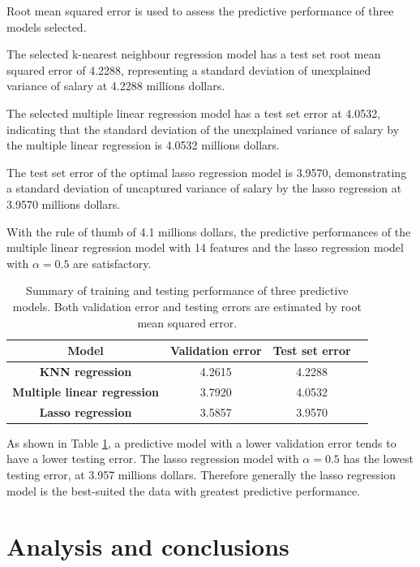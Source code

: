\documentclass[letterpaper,12pt,twoside,]{pinp}
\begin{document}
Root mean squared error is used to assess the predictive performance of
three models selected.

The selected k-nearest neighbour regression model has a test set root
mean squared error of 4.2288, representing a standard deviation of
unexplained variance of salary at 4.2288 millions dollars.

The selected multiple linear regression model has a test set error at
4.0532, indicating that the standard deviation of the unexplained
variance of salary by the multiple linear regression is 4.0532 millions
dollars.

The test set error of the optimal lasso regression model is 3.9570,
demonstrating a standard deviation of uncaptured variance of salary by
the lasso regression at 3.9570 millions dollars.

With the rule of thumb of 4.1 millions dollars, the predictive
performances of the multiple linear regression model with 14 features
and the lasso regression model with \(\alpha=0.5\) are satisfactory.

\begin{table}
\begin{tabular}{ |c|c|c|c| } 
\hline
\textbf{Model} & \textbf{Validation error} & \textbf{Test set error} \\
\hline
\textbf{KNN regression} & 4.2615 & 4.2288 \\ 
\textbf{Multiple linear regression} & 3.7920 & 4.0532 \\
\textbf{Lasso regression} & 3.5857 & 3.9570 \\
\hline
\end{tabular}
\centering
\caption{Summary of training and testing performance of three predictive models. Both validation error and testing errors are estimated by root mean squared error.}
\label{table:errors}
\end{table}

As shown in Table \ref{table:errors}, a predictive model with a lower
validation error tends to have a lower testing error. The lasso
regression model with \(\alpha=0.5\) has the lowest testing error, at
3.957 millions dollars. Therefore generally the lasso regression model
is the best-suited the data with greatest predictive performance.

\hypertarget{analysis-and-conclusions}{%
\section{Analysis and conclusions}\label{analysis-and-conclusions}}
\end{document}
